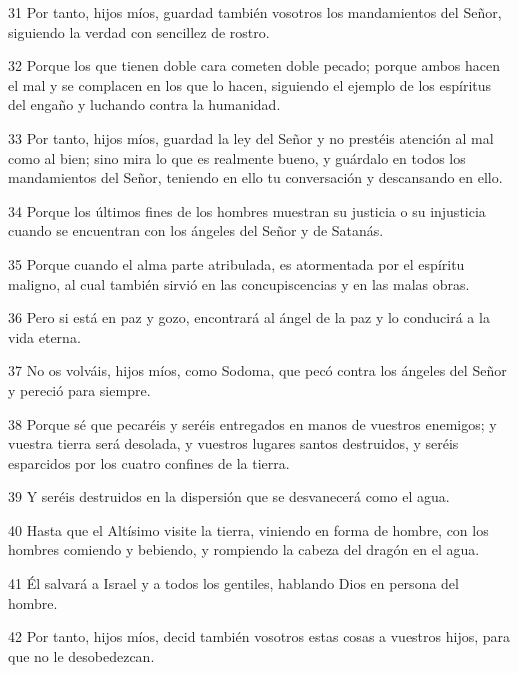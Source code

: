 \par 31 Por tanto, hijos míos, guardad también vosotros los mandamientos del Señor, siguiendo la verdad con sencillez de rostro.

\par 32 Porque los que tienen doble cara cometen doble pecado; porque ambos hacen el mal y se complacen en los que lo hacen, siguiendo el ejemplo de los espíritus del engaño y luchando contra la humanidad.

\par 33 Por tanto, hijos míos, guardad la ley del Señor y no prestéis atención al mal como al bien; sino mira lo que es realmente bueno, y guárdalo en todos los mandamientos del Señor, teniendo en ello tu conversación y descansando en ello.

\par 34 Porque los últimos fines de los hombres muestran su justicia o su injusticia cuando se encuentran con los ángeles del Señor y de Satanás.

\par 35 Porque cuando el alma parte atribulada, es atormentada por el espíritu maligno, al cual también sirvió en las concupiscencias y en las malas obras.

\par 36 Pero si está en paz y gozo, encontrará al ángel de la paz y lo conducirá a la vida eterna.

\par 37 No os volváis, hijos míos, como Sodoma, que pecó contra los ángeles del Señor y pereció para siempre.

\par 38 Porque sé que pecaréis y seréis entregados en manos de vuestros enemigos; y vuestra tierra será desolada, y vuestros lugares santos destruidos, y seréis esparcidos por los cuatro confines de la tierra.

\par 39 Y seréis destruidos en la dispersión que se desvanecerá como el agua.

\par 40 Hasta que el Altísimo visite la tierra, viniendo en forma de hombre, con los hombres comiendo y bebiendo, y rompiendo la cabeza del dragón en el agua.

\par 41 Él salvará a Israel y a todos los gentiles, hablando Dios en persona del hombre.

\par 42 Por tanto, hijos míos, decid también vosotros estas cosas a vuestros hijos, para que no le desobedezcan.

